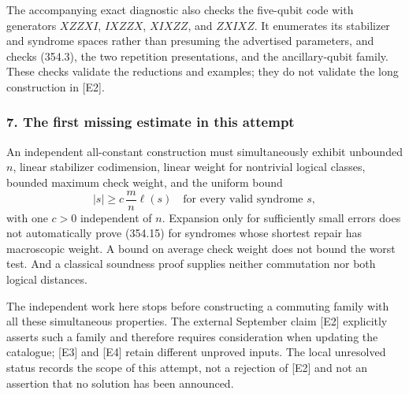 \documentclass[11pt]{article}
\begin{document}
The accompanying exact diagnostic also checks the five-qubit code with generators $XZZXI$, $IXZZX$, $XIXZZ$, and $ZXIXZ$. It enumerates its stabilizer and syndrome spaces rather than presuming the advertised parameters, and checks (354.3), the two repetition presentations, and the ancillary-qubit family. These checks validate the reductions and examples; they do not validate the long construction in [E2].

\subsubsection{7. The first missing estimate in this attempt}
An independent all-constant construction must simultaneously exhibit unbounded $n$, linear stabilizer codimension, linear weight for nontrivial logical classes, bounded maximum check weight, and the uniform bound
\[
 |s|\ge c\,\frac mn\ell(s)
 \quad\text{for every valid syndrome }s,
 \tag{354.15}
\]
with one $c>0$ independent of $n$. Expansion only for sufficiently small errors does not automatically prove (354.15) for syndromes whose shortest repair has macroscopic weight. A bound on average check weight does not bound the worst test. And a classical soundness proof supplies neither commutation nor both logical distances.

The independent work here stops before constructing a commuting family with all these simultaneous properties. The external September claim [E2] explicitly asserts such a family and therefore requires consideration when updating the catalogue; [E3] and [E4] retain different unproved inputs. The local unresolved status records the scope of this attempt, not a rejection of [E2] and not an assertion that no solution has been announced.
\end{document}
